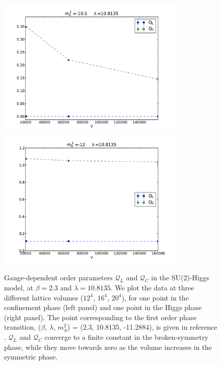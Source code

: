 \begin{figure}[thb] 
\begin{adjustwidth}{-4em}{-4em}
  \includegraphics[width=9cm,clip]{pics/SU2H_volume_symm}\includegraphics[width=9cm,clip]{pics/SU2H_volume_Higgs}
\end{adjustwidth}
  \caption{Gauge-dependent order parameters $\mathcal Q_L$ and $\mathcal Q_C$ in the SU(2)-Higgs model, at $\beta = 2.3$ and $\lambda = 10.8135$. We plot the data at three different lattice volumes ($12^4$, $16^4$, $20^4$), for one point in the confinement phase (left panel) and one point in the Higgs phase (right panel). The point corresponding to the first order phase transition, ($\beta$, $\lambda$, $m_S^2$) = (2.3, 10.8135, -11.2884), is given in reference \cite{Langguth:1985eu}. $\mathcal Q_L$ and $\mathcal Q_C$ converge to a finite constant in the broken-symmetry phase, while they move towards zero as the volume increases in the symmetric phase.}
  \label{SU2H_volume_scaling}
\end{figure}


